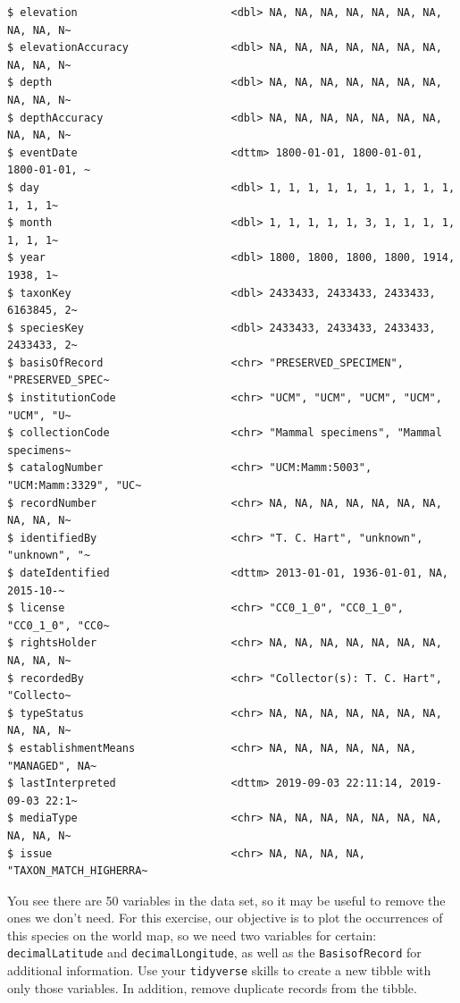 \documentclass[
  letterpaper,
  DIV=11,
  numbers=noendperiod]{scrreprt}
\begin{document}
\begin{verbatim}
$ elevation                        <dbl> NA, NA, NA, NA, NA, NA, NA, NA, NA, N~
$ elevationAccuracy                <dbl> NA, NA, NA, NA, NA, NA, NA, NA, NA, N~
$ depth                            <dbl> NA, NA, NA, NA, NA, NA, NA, NA, NA, N~
$ depthAccuracy                    <dbl> NA, NA, NA, NA, NA, NA, NA, NA, NA, N~
$ eventDate                        <dttm> 1800-01-01, 1800-01-01, 1800-01-01, ~
$ day                              <dbl> 1, 1, 1, 1, 1, 1, 1, 1, 1, 1, 1, 1, 1~
$ month                            <dbl> 1, 1, 1, 1, 1, 3, 1, 1, 1, 1, 1, 1, 1~
$ year                             <dbl> 1800, 1800, 1800, 1800, 1914, 1938, 1~
$ taxonKey                         <dbl> 2433433, 2433433, 2433433, 6163845, 2~
$ speciesKey                       <dbl> 2433433, 2433433, 2433433, 2433433, 2~
$ basisOfRecord                    <chr> "PRESERVED_SPECIMEN", "PRESERVED_SPEC~
$ institutionCode                  <chr> "UCM", "UCM", "UCM", "UCM", "UCM", "U~
$ collectionCode                   <chr> "Mammal specimens", "Mammal specimens~
$ catalogNumber                    <chr> "UCM:Mamm:5003", "UCM:Mamm:3329", "UC~
$ recordNumber                     <chr> NA, NA, NA, NA, NA, NA, NA, NA, NA, N~
$ identifiedBy                     <chr> "T. C. Hart", "unknown", "unknown", "~
$ dateIdentified                   <dttm> 2013-01-01, 1936-01-01, NA, 2015-10-~
$ license                          <chr> "CC0_1_0", "CC0_1_0", "CC0_1_0", "CC0~
$ rightsHolder                     <chr> NA, NA, NA, NA, NA, NA, NA, NA, NA, N~
$ recordedBy                       <chr> "Collector(s): T. C. Hart", "Collecto~
$ typeStatus                       <chr> NA, NA, NA, NA, NA, NA, NA, NA, NA, N~
$ establishmentMeans               <chr> NA, NA, NA, NA, NA, NA, "MANAGED", NA~
$ lastInterpreted                  <dttm> 2019-09-03 22:11:14, 2019-09-03 22:1~
$ mediaType                        <chr> NA, NA, NA, NA, NA, NA, NA, NA, NA, N~
$ issue                            <chr> NA, NA, NA, NA, "TAXON_MATCH_HIGHERRA~
\end{verbatim}

You see there are 50 variables in the data set, so it may be useful to
remove the ones we don't need. For this exercise, our objective is to
plot the occurrences of this species on the world map, so we need two
variables for certain: \texttt{decimalLatitude} and
\texttt{decimalLongitude}, as well as the \texttt{BasisofRecord} for
additional information. Use your \texttt{tidyverse} skills to create a
new tibble with only those variables. In addition, remove duplicate
records from the tibble.
\end{document}
